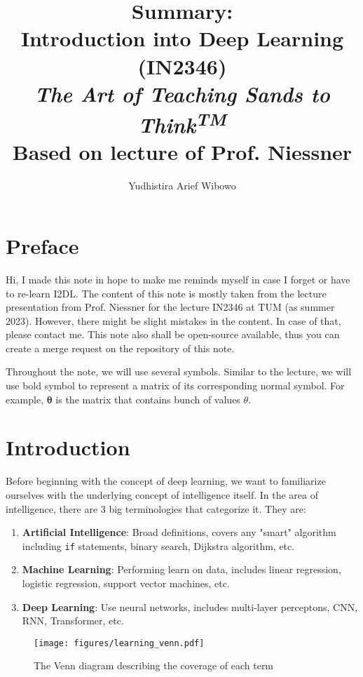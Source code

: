 \documentclass[10pt]{article}
\title{Summary:\\
    Introduction into Deep Learning (IN2346)
    \\
    \large{\textit{The Art of Teaching Sands to Think\textsuperscript{TM}}}
    \\\vspace{0.5em}
    \small{Based on lecture of Prof. Niessner}
    }
\author{Yudhistira Arief Wibowo}
\begin{document}
\maketitle

\newpage 

\section*{Preface}

Hi, I made this note in hope to make me reminds myself in case I forget or have to re-learn I2DL. 
The content of this note is mostly taken from the lecture presentation from Prof. Niessner for 
the lecture IN2346 at TUM (as summer 2023). However, there might be slight mistakes in the content.
In case of that, please contact me. This note also shall be open-source available, thus you can 
create a merge request on the repository of this note.

Throughout the note, we will use several symbols. Similar to the lecture, we will use bold symbol 
to represent a matrix of its corresponding normal symbol. For example, $\pmb\theta$ is the matrix 
that contains bunch of values $\theta$.

\newpage

\section{Introduction}

Before beginning with the concept of deep learning, we want
to familiarize ourselves with the underlying concept of intelligence
itself. In the area of intelligence, there are 3 big terminologies
that categorize it. They are:


\begin{enumerate}
    \item \textbf{Artificial Intelligence}: Broad definitions, covers 
        any "smart" algorithm including \texttt{if} statements, 
        binary search, Dijkstra algorithm, etc. 
    \item \textbf{Machine Learning}: Performing learn on data, includes 
        linear regression, logistic regression, support vector 
        machines, etc.
    \item \textbf{Deep Learning}: Use neural networks, includes multi-layer
        perceptons, CNN, RNN, Transformer, etc. 
\end{enumerate}

\begin{marginfigure}
    \begin{figure}[H]
        \centering
        \texttt{[image: figures/learning\_venn.pdf]}
        \caption{The Venn diagram describing the coverage of each term}
    \end{figure}
\end{marginfigure}
\end{document}
